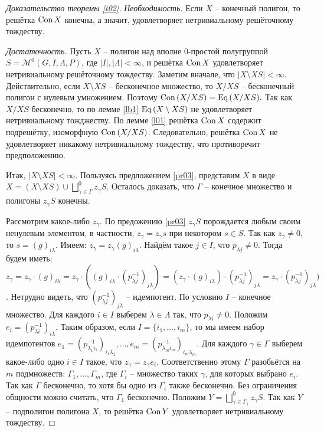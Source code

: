 \documentclass[a4paper]{article}
\newcommand{\Con}{\textnormal{Con}\, }
\newcommand{\Eq}{\textnormal{Eq}\, }
\begin{document}
	\begin{proof}[Доказательство теоремы \ref{t02}]
		\par \textit{Необходимость.} Если $X$ -- конечный полигон, то решётка $\Con X$ конечна, а значит, удовлетворяет нетривиальному решёточному тождеству.
		\par \textit{Достаточность.} Пусть $X$ -- полигон над вполне 0-простой полугруппой $S = \mathcal{M}^0(G,I,\Lambda,P)$, где $|I|,|\Lambda| < \infty$, и решётка $\Con X$ удовлетворяет нетривиальному решёточному тождеству. Заметим вначале, что $|X \setminus XS| < \infty$. Действительно, если $X \setminus XS$ -- бесконечное множество, то ${X}/{XS}$ -- бесконечный полигон с нулевым умножением. Поэтому $\Con ({X}/{XS}) = \Eq ({X}/{XS}).$ Так как ${X}/{XS}$ бесконечно, то по лемме \ref{lb1} $\Eq (X \setminus XS)$ не удовлетворяет нетривиальному тожджеству. По лемме \ref{l01} решётка $\Con X$ содержит подрешётку, изоморфную $\Con ({X}/{XS})$. Следовательно, решётка $\Con X$ не удовлетворяет никакому нетривиальному тождеству, что противоречит предположению.
		\par Итак, $|X \setminus XS| < \infty$. Пользуясь предложением \ref{pr03}, представим $X$ в виде $X = (X \setminus XS) \cup \bigsqcup_{\gamma \in \Gamma}^0 z_{\gamma} S $. Осталось доказать, что $\Gamma$ -- конечное множество и полигоны $z_{\gamma}S$ конечны.
		\par Рассмотрим какое-либо $z_\gamma$. По предожению \ref{pr03} $z_\gamma S$ порождается любым своим ненулевым элементом, в частности, $z_\gamma = z_\gamma s$ при некотором $s \in S$. Так как $z_\gamma \neq 0$, то $s = (g)_{i \lambda}$. Имеем: $z_\gamma = z_\gamma (g)_{i \lambda}$. Найдём такое $j \in I$, что $p_{\lambda j} \neq 0$. Тогда будем иметь: $z_\gamma = z_\gamma \cdot (g)_{i \lambda} = z_\gamma \cdot ((g)_{i \lambda} \cdot (p_{\lambda j}^{-1})_{j \lambda}) = (z_\gamma \cdot (g)_{i \lambda}) \cdot (p_{\lambda j}^{-1})_{j \lambda} = z_\gamma \cdot (p_{\lambda j}^{-1})_{j \lambda}) $. Нетрудно видеть, что $(p_{\lambda j}^{-1})_{j \lambda}$ -- идемпотент. По условию $I$ -- конечное множество. Для каждого $i \in I$ выберем $\lambda \in \Lambda$ так, что $p_{\lambda i} \neq 0$. Положим $e_i = (p_{\lambda i}^{-1})_{i \lambda}$. Таким образом, если $I = \{ i_1,\ldots,i_m \}$, то мы имеем набор идемпотентов $e_1 = (p_{\lambda_1 i_1}^{-1})_{i_1 \lambda_1},\ldots,e_m = (p_{\lambda_m i_m}^{-1})_{i_m \lambda_m}$. Для каждого $\gamma \in \Gamma$ выберем какое-либо одно $i \in I$ такое, что $z_\gamma = z_\gamma e_i$. Соответственно этому $\Gamma$ разобьётся на $m$ подмножеств: $\Gamma_1,\ldots,\Gamma_m$, где $\Gamma_i$ -- множество таких $\gamma$, для которых выбрано $e_i$. Так как $\Gamma$ бесконечно, то хотя бы одно из $\Gamma_i$ также бесконечно. Без ограничения общности можно считать, что $\Gamma_1$ бесконечно. Положим $Y = \bigsqcup_{\gamma \in \Gamma_1	}^0 z_{\gamma} S$. Так как $Y$ -- подполигон полигона $X$, то решётка $\Con Y$ удовлетворяет нетривиальному тождеству.

\end{proof}
\end{document}
